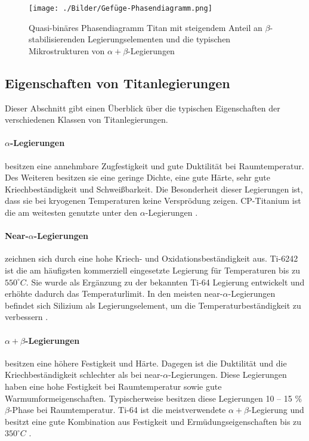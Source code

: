 \begin{figure}[h]
	\centering
	\texttt{[image: ./Bilder/Gefüge-Phasendiagramm.png]}
	\caption{Quasi-binäres Phasendiagramm Titan mit steigendem Anteil an $\beta$-stabilisierenden
    Legierungselementen und die typischen Mikrostrukturen von $\alpha+\beta$-Legierungen}
	\label{fig:gefuge-phasendiagramm}
\end{figure}

\subsection{Eigenschaften von Titanlegierungen}

Dieser Abschnitt gibt einen Überblick über die typischen  Eigenschaften der verschiedenen Klassen von Titanlegierungen.

\paragraph{$\alpha$-Legierungen}  
besitzen eine annehmbare Zugfestigkeit und gute Duktilität bei Raumtemperatur. Des Weiteren besitzen sie eine geringe Dichte, eine gute Härte, sehr gute Kriechbeständigkeit und Schweißbarkeit. Die Besonderheit dieser Legierungen ist, dass sie bei kryogenen Temperaturen keine Versprödung zeigen. CP-Titanium ist die am weitesten genutzte unter den $\alpha$-Legierungen \cite{C.Leyens.2005,Lutjering.2007,M.J.Donachie.2010}.

\paragraph{Near-$\alpha$-Legierungen} 
zeichnen sich durch eine hohe Kriech- und Oxidationsbeständigkeit aus. Ti-6242 ist die am häufigsten kommerziell eingesetzte Legierung für Temperaturen bis zu $550 ^\circ C$. 
Sie wurde als Ergänzung zu der bekannten Ti-64 Legierung entwickelt und erhöhte dadurch das Temperaturlimit. In den meisten near-$\alpha$-Legierungen befindet sich Silizium als Legierungselement, um die Temperaturbeständigkeit zu verbessern \cite{C.Leyens.2005,Lutjering.2007}. 

\paragraph{$\alpha+\beta$-Legierungen} besitzen eine höhere Festigkeit und Härte. Dagegen ist die Duktilität und die Kriechbeständigkeit schlechter als bei near-$\alpha$-Legierungen. Diese Legierungen haben eine hohe Festigkeit bei Raumtemperatur sowie gute Warmumformeigenschaften. Typischerweise besitzen diese Legierungen 10 -- 15 \% $\beta$-Phase bei Raumtemperatur. Ti-64 ist die meistverwendete $\alpha+\beta$-Legierung und besitzt eine gute Kombination aus Festigkeit und Ermüdungseigenschaften bis zu $350 ^\circ C$ \cite{Boyer.2007,M.J.Donachie.2010}. 

